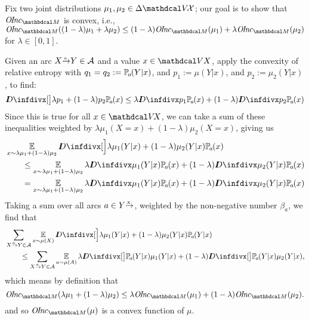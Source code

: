 \begin{subappendices}
{\begin{lproof}
Fix two joint distributions $\mu_1, \mu_2 \in \Delta \V\!\X$;
our goal is to show that $\OInc_{\dg M}$ is convex, i.e.,
$\OInc_{\dg M}( (1-\lambda) \mu_1 + \lambda \mu_2) \le (1-\lambda) \OInc_{\dg M}(\mu_1) + \lambda \OInc_{\dg M}(\mu_2)$ for $\lambda \in [0,1]$.

Given an arc $\ed aXY \in \Ar$ and a value $x \in \V X$,
apply the convexity of relative entropy  with $q_1 = q_2 := \p_a(Y|x)$, 
and $p_1 := \mu(Y|x)$, and $p_2 := \mu_2(Y|x)$, to find:
\[ 
    \kldiv[\big]{  \lambda p_1 + (1-\lambda) p_2 }{ \p_a(x) }
        \leq
     \lambda \kldiv{ p_1 }{ \p_a(x) } + (1-\lambda) \kldiv { p_2 }{ \p_a(x) }
\] 
Since this is true for all $x \in \V\!X$, we can take a sum of 
these inequalities weighted by $\lambda \mu_1(X{=}x) + (1-\lambda)\mu_2(X{=}x)$, 
giving us
\begin{align*}
	&\Ex_{x \sim \lambda \mu_1 + (1-\lambda)\mu_2}
        \kldiv[\Big]{\lambda \mu_1(Y|x) +
		(1-\lambda) \mu_2(Y|x)}{\p_a(x)} 
    \\&\qquad\leq 
		 \Ex_{x \sim \lambda \mu_1 + (1-\lambda)\mu_2}
               \lambda  \kldiv {\mu_1(Y|x)}{\p_a(x)} +
			(1-\lambda) \kldiv {\mu_2(Y|x)}{\p_a(x)}
    \\&\qquad=
        \Ex_{x \sim \lambda \mu_1 + (1-\lambda)\mu_2}
              \lambda  \kldiv {\mu_1(Y|x)}{\p_a(x)} +
           (1-\lambda) \kldiv {\mu_2(Y|x)}{\p_a(x)}
\end{align*}
Taking a sum over all arcs $a \in \ed XY$, weighted by the non-negative
number $\beta_a$, we find that
\begin{align*}
	&\sum_{\ed aXY \in \Ar} \Ex_{x\sim \mu(X)} 
        \kldiv[\Big]{\lambda \mu_1(Y|x) + (1-\lambda) \mu_2(Y|x) } { \p_a(Y|x) }
	\\&\qquad
        \leq \sum_{\ed aXY \in \Ar}
            \Ex_{a\sim \mu(A)}
                     \lambda  \kldiv[\big]{\p_a(Y|x)}{ \mu_1(Y|x) } 
                + (1-\lambda) \kldiv[\big]{\p_a(Y|x)}{ \mu_2(Y|x) },
\end{align*}
which means by definition that
\[
	\OInc_{\dg M}( \lambda \mu_1 + (1-\lambda) \mu_2)
		\leq \lambda \OInc_{\dg M}(\mu_1) + (1-\lambda)
				\OInc_{\dg M}(\mu_2). 
\]
and so $\OInc_{\dg M}( \mu )$ is a convex function of $\mu$.
\end{lproof}
}%


\end{subappendices}
